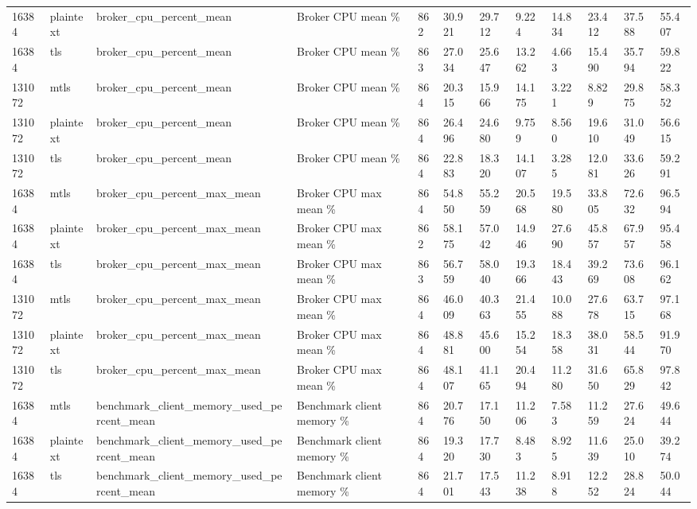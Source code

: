 \begin{longtable}{llllllllllll}
16384 & plaintext & broker\_cpu\_percent\_mean & Broker CPU mean \% & 862 & 30.921 & 29.712 & 9.224 & 14.834 & 23.412 & 37.588 & 55.407 \\
16384 & tls & broker\_cpu\_percent\_mean & Broker CPU mean \% & 863 & 27.034 & 25.647 & 13.262 & 4.663 & 15.490 & 35.794 & 59.822 \\
131072 & mtls & broker\_cpu\_percent\_mean & Broker CPU mean \% & 864 & 20.315 & 15.966 & 14.175 & 3.221 & 8.829 & 29.875 & 58.352 \\
131072 & plaintext & broker\_cpu\_percent\_mean & Broker CPU mean \% & 864 & 26.496 & 24.680 & 9.759 & 8.560 & 19.610 & 31.049 & 56.615 \\
131072 & tls & broker\_cpu\_percent\_mean & Broker CPU mean \% & 864 & 22.883 & 18.320 & 14.107 & 3.285 & 12.081 & 33.626 & 59.291 \\
16384 & mtls & broker\_cpu\_percent\_max\_mean & Broker CPU max mean \% & 864 & 54.850 & 55.259 & 20.568 & 19.580 & 33.805 & 72.632 & 96.594 \\
16384 & plaintext & broker\_cpu\_percent\_max\_mean & Broker CPU max mean \% & 862 & 58.175 & 57.042 & 14.946 & 27.690 & 45.857 & 67.957 & 95.458 \\
16384 & tls & broker\_cpu\_percent\_max\_mean & Broker CPU max mean \% & 863 & 56.759 & 58.040 & 19.366 & 18.443 & 39.269 & 73.608 & 96.162 \\
131072 & mtls & broker\_cpu\_percent\_max\_mean & Broker CPU max mean \% & 864 & 46.009 & 40.363 & 21.455 & 10.088 & 27.678 & 63.715 & 97.168 \\
131072 & plaintext & broker\_cpu\_percent\_max\_mean & Broker CPU max mean \% & 864 & 48.881 & 45.600 & 15.254 & 18.358 & 38.031 & 58.544 & 91.970 \\
131072 & tls & broker\_cpu\_percent\_max\_mean & Broker CPU max mean \% & 864 & 48.107 & 41.165 & 20.494 & 11.280 & 31.650 & 65.829 & 97.842 \\
16384 & mtls & benchmark\_client\_memory\_used\_percent\_mean & Benchmark client memory \% & 864 & 20.776 & 17.150 & 11.206 & 7.583 & 11.259 & 27.624 & 49.644 \\
16384 & plaintext & benchmark\_client\_memory\_used\_percent\_mean & Benchmark client memory \% & 864 & 19.320 & 17.730 & 8.483 & 8.925 & 11.639 & 25.010 & 39.274 \\
16384 & tls & benchmark\_client\_memory\_used\_percent\_mean & Benchmark client memory \% & 864 & 21.701 & 17.543 & 11.238 & 8.918 & 12.252 & 28.824 & 50.044 \\

\end{longtable}
